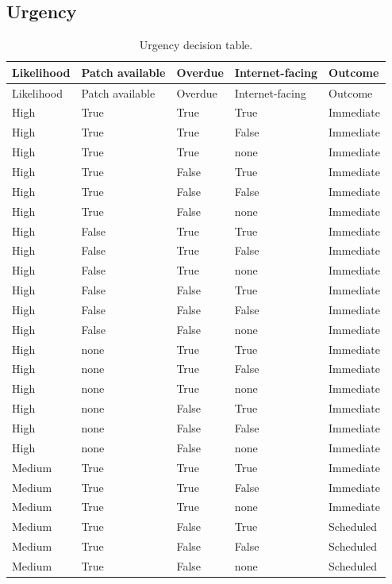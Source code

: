 \subsection{Urgency}
\begin{longtable}{@{}lllll@{}}
\caption{Urgency decision table.}\label{tab:dt-urgency}\\
\toprule
Likelihood & Patch available & Overdue & Internet-facing & Outcome \\ \midrule
\endfirsthead
\toprule Likelihood & Patch available & Overdue & Internet-facing & Outcome \\ \midrule
\endhead
\bottomrule
\endfoot
High & True & True & True & Immediate \\
High & True & True & False & Immediate \\
High & True & True & none & Immediate \\
High & True & False & True & Immediate \\
High & True & False & False & Immediate \\
High & True & False & none & Immediate \\
High & False & True & True & Immediate \\
High & False & True & False & Immediate \\
High & False & True & none & Immediate \\
High & False & False & True & Immediate \\
High & False & False & False & Immediate \\
High & False & False & none & Immediate \\
High & none & True & True & Immediate \\
High & none & True & False & Immediate \\
High & none & True & none & Immediate \\
High & none & False & True & Immediate \\
High & none & False & False & Immediate \\
High & none & False & none & Immediate \\
Medium & True & True & True & Immediate \\
Medium & True & True & False & Immediate \\
Medium & True & True & none & Immediate \\
Medium & True & False & True & Scheduled \\
Medium & True & False & False & Scheduled \\
Medium & True & False & none & Scheduled \\

\end{longtable}
